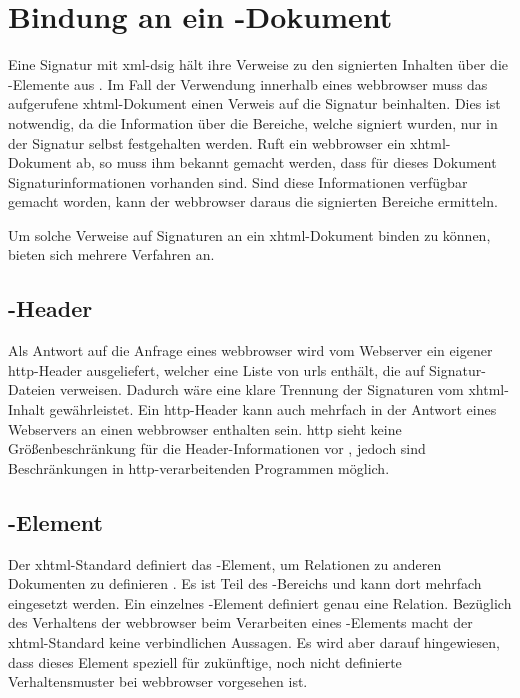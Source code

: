 
\chapter{Bindung an ein -Dokument}
\label{chap:Signaturbindung}
Eine Signatur mit \gls{xml-dsig} hält ihre Verweise zu den signierten Inhalten über die -Elemente aus .
Im Fall der Verwendung innerhalb eines \gls{webbrowser} muss das aufgerufene \gls{xhtml}-Dokument einen Verweis auf die Signatur beinhalten. Dies ist notwendig,
da die Information über die Bereiche, welche signiert wurden, nur in der Signatur selbst festgehalten werden. Ruft ein \gls{webbrowser} ein \gls{xhtml}-Dokument
ab, so muss ihm bekannt gemacht werden, dass für dieses Dokument Signaturinformationen vorhanden sind. Sind diese Informationen verfügbar gemacht worden, kann
der \gls{webbrowser} daraus die signierten Bereiche ermitteln.

Um solche Verweise auf Signaturen an ein \gls{xhtml}-Dokument binden zu können, bieten sich mehrere Verfahren an.

\section{-Header}
Als Antwort auf die Anfrage eines \gls{webbrowser} wird vom Webserver ein eigener \gls{http}-Header ausgeliefert, welcher eine Liste von \glspl{url} enthält, die auf
Signatur-Dateien verweisen. Dadurch wäre eine klare Trennung der Signaturen vom \gls{xhtml}-Inhalt gewährleistet.
Ein \gls{http}-Header kann auch mehrfach in der Antwort eines Webservers an einen \gls{webbrowser} enthalten sein. \gls{http} sieht keine Größenbeschränkung für
die Header-Informationen vor \cite{http:ietf}, jedoch sind Beschränkungen in \gls{http}-verarbeitenden Programmen möglich.



\section{-Element}
Der \gls{xhtml}-Standard definiert das -Element, um Relationen zu anderen Dokumenten zu definieren \cite{xhtml:oreilly}. Es ist Teil des
-Bereichs und kann dort mehrfach eingesetzt werden. Ein einzelnes -Element definiert genau eine Relation. Bezüglich des Verhaltens
der \gls{webbrowser} beim Verarbeiten eines -Elements macht der \gls{xhtml}-Standard keine verbindlichen Aussagen. Es wird aber darauf
hingewiesen, dass dieses Element speziell für zukünftige, noch nicht definierte Verhaltensmuster bei \gls{webbrowser} vorgesehen ist.

